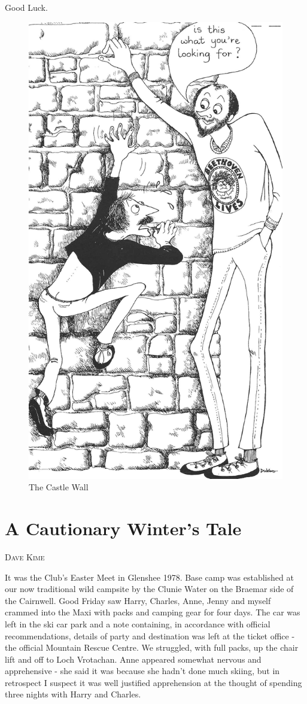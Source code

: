 \documentclass[a5paper,openany,font 10pt]{scrbook}
\makeatletter
\newcommand{\chapterauthor}[1]{%
{\parindent0pt\vspace*{-5pt}%
\linespread{1.1}\large\scshape#1%
\par\nobreak\vspace*{35pt}}
\@afterheading%
}
\makeatother
\begin{document}
Good Luck.
\begin{figure}[htb]
\centering
\includegraphics[width=.9\linewidth]{./images/Cartoon_03.jpg}
\caption{\label{fig:org986344e}
The Castle Wall}
\end{figure}

\chapter{A Cautionary Winter's Tale}
\label{sec:orgba921e9}
\chapterauthor{Dave Kime}


It was the Club's Easter Meet in Glenshee 1978. Base camp
was established at our now traditional wild campsite by the
Clunie Water on the Braemar side of the Cairnwell. Good Friday
saw Harry, Charles, Anne, Jenny and myself crammed into the Maxi
with packs and camping gear for four days. The car was left in
the ski car park and a note  containing, in accordance with
official recommendations, details of party and destination  was
left at the ticket office - the official Mountain Rescue Centre.
We struggled, with full packs, up the chair lift and off to Loch
Vrotachan. Anne appeared somewhat nervous and apprehensive - she
said it was because she hadn't done much skiing, but in
retrospect I suspect it was well justified apprehension at the
thought of spending three nights with Harry and Charles.
\end{document}
